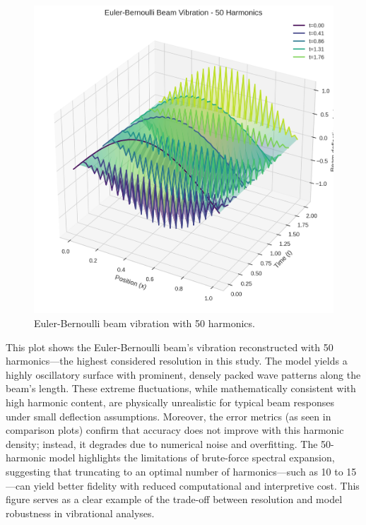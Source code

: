 \documentclass[preprint,12pt]{elsarticle}
\begin{document}
\begin{figure}[t]
    \centering
    \includegraphics[width=0.9\linewidth]{figures/euler_bernoulli_3d_50h.png}
    \caption{Euler-Bernoulli beam vibration with 50 harmonics.}
    \label{fig:euler_50h}
\end{figure}

This plot shows the Euler-Bernoulli beam’s vibration reconstructed with 50 harmonics—the highest considered resolution in this study. The model yields a highly oscillatory surface with prominent, densely packed wave patterns along the beam's length. These extreme fluctuations, while mathematically consistent with high harmonic content, are physically unrealistic for typical beam responses under small deflection assumptions. Moreover, the error metrics (as seen in comparison plots) confirm that accuracy does not improve with this harmonic density; instead, it degrades due to numerical noise and overfitting. The 50-harmonic model highlights the limitations of brute-force spectral expansion, suggesting that truncating to an optimal number of harmonics—such as 10 to 15—can yield better fidelity with reduced computational and interpretive cost. This figure serves as a clear example of the trade-off between resolution and model robustness in vibrational analyses.
\end{document}
